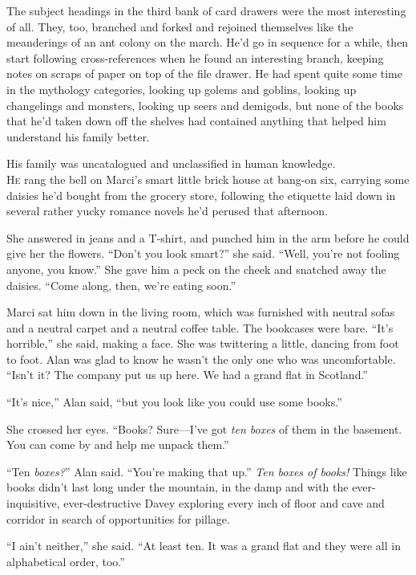 The subject headings in the third bank of card drawers were the most
interesting of all.  They, too, branched and forked and rejoined
themselves like the meanderings of an ant colony on the march.  He'd
go in sequence for a while, then start following cross-references when
he found an interesting branch, keeping notes on scraps of paper on
top of the file drawer.  He had spent quite some time in the mythology
categories, looking up golems and goblins, looking up changelings and
monsters, looking up seers and demigods, but none of the books that
he'd taken down off the shelves had contained anything that helped him
understand his family better.

His family was uncatalogued and unclassified in human knowledge.
\\
\lettrine[lines=3, lhang=.5, nindent=0pt, findent=2pt]{H}{e} rang the bell on Marci's smart little brick house at bang-on six,
carrying some daisies he'd bought from the grocery store, following
the etiquette laid down in several rather yucky romance novels he'd
perused that afternoon.

She answered in jeans and a T-shirt, and punched him in the arm before
he could give her the flowers.  ``Don't you look smart?'' she said. 
``Well, you're not fooling anyone, you know.'' She gave him a peck on
the cheek and snatched away the daisies.  ``Come along, then, we're
eating soon.''

Marci sat him down in the living room, which was furnished with
neutral sofas and a neutral carpet and a neutral coffee table.  The
bookcases were bare.  ``It's horrible,'' she said, making a face.  She
was twittering a little, dancing from foot to foot.  Alan was glad to
know he wasn't the only one who was uncomfortable.  ``Isn't it?  The
company put us up here.  We had a grand flat in Scotland.''

``It's nice,'' Alan said, ``but you look like you could use some
books.''

She crossed her eyes.  ``Books?  Sure---I've got \textit{ten boxes} of
them in the basement.  You can come by and help me unpack them.''

``Ten \textit{boxes?}'' Alan said.  ``You're making that up.''
\textit{Ten boxes of books!} Things like books didn't last long under
the mountain, in the damp and with the ever-inquisitive,
ever-destructive Davey exploring every inch of floor and cave and
corridor in search of opportunities for pillage.

``I ain't neither,'' she said.  ``At least ten.  It was a grand flat
and they were all in alphabetical order, too.''

